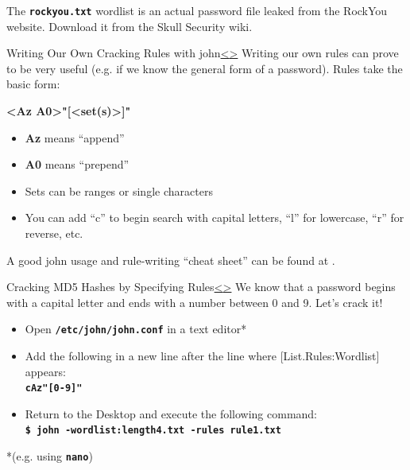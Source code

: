 \documentclass[12pt]{extarticle}
\newcommand{\code}[1]{\texttt{\bfseries#1}}
\newenvironment{instructionblock}{\Large\bgroup}{\egroup}
\begin{document}
	The \code{rockyou.txt} wordlist is an actual password file leaked from the RockYou website. Download it from the Skull Security wiki. \cite{rockyou}
	
	\pagebreak
	\begin{slide}{Writing Our Own Cracking Rules with john}{\hyperref[slide 11]{\textless}\hyperref[slide 13]{\textgreater}}
		\begin{instructionblock}
			Writing our own rules can prove to be very useful (e.g. if we know the general form of a password). Rules take the basic form: 
			
			\hskip 50pt \textbf{\textless Az \textbar  A0\textgreater"[\textless set(s)\textgreater ]"}
			
			\begin{itemize}
				\item \textbf{Az} means ``append''
				\item \textbf{A0} means ``prepend''
				\item Sets can be ranges or single characters
				\item You can add ``c'' to begin search with capital letters, ``l'' for lowercase, ``r'' for reverse, etc. \cite{cheat}
				
			\end{itemize}
		\end{instructionblock}
	\end{slide}
	\vfill
	
	A good john usage and rule-writing ``cheat sheet'' can be found at \cite{cheat}.
	
	\pagebreak
	\begin{slide}{Cracking MD5 Hashes by Specifying Rules}{\hyperref[slide 12]{\textless}\hyperref[slide 14]{\textgreater}}
		\begin{instructionblock}
			We know that a password begins with a capital letter and ends with a number between 0 and 9. Let's crack it!
			\begin{itemize}
				\item Open \code{/etc/john/john.conf} in a text editor*
				\item Add the following in a new line after the line where [List.Rules:Wordlist] appears: \\
				\code{cAz"[0-9]"}
				\item Return to the Desktop and execute the following command:\\
				\code{\$ john -wordlist:length4.txt -rules rule1.txt}
				
			\end{itemize}
		\end{instructionblock}
	\end{slide}
	*(e.g. using \code{nano})
	
\end{document}
